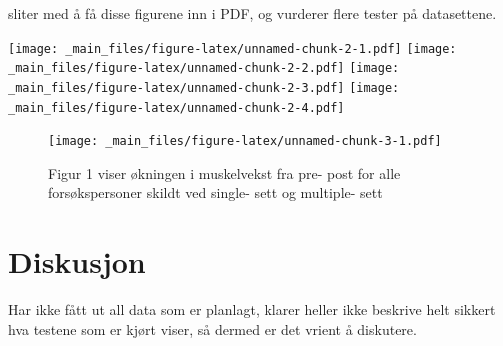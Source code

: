 \documentclass[
]{book}
\begin{document}
sliter med å få disse figurene inn i PDF, og vurderer flere tester på datasettene.

\texttt{[image: \_main\_files/figure-latex/unnamed-chunk-2-1.pdf]} \texttt{[image: \_main\_files/figure-latex/unnamed-chunk-2-2.pdf]} \texttt{[image: \_main\_files/figure-latex/unnamed-chunk-2-3.pdf]} \texttt{[image: \_main\_files/figure-latex/unnamed-chunk-2-4.pdf]}

\begin{figure}
\centering
\texttt{[image: \_main\_files/figure-latex/unnamed-chunk-3-1.pdf]}
\caption{\label{fig:unnamed-chunk-3}Figur 1 viser økningen i muskelvekst fra pre- post for alle forsøkspersoner skildt ved single- sett og multiple- sett}
\end{figure}

\hypertarget{diskusjon-1}{%
\section{Diskusjon}\label{diskusjon-1}}

Har ikke fått ut all data som er planlagt, klarer heller ikke beskrive helt sikkert hva testene som er kjørt viser, så dermed er det vrient å diskutere.

  
\end{document}
